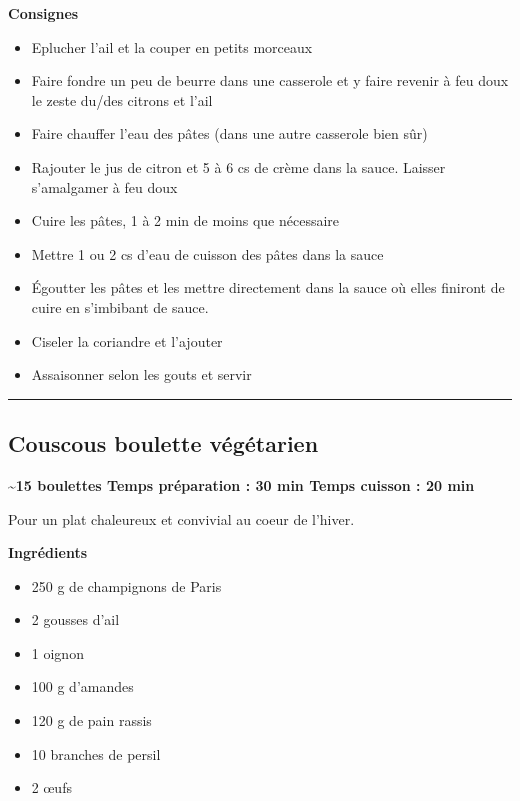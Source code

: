 \documentclass[]{book}
\providecommand{\tightlist}{%
  \setlength{\itemsep}{0pt}\setlength{\parskip}{0pt}}
\begin{document}
\textbf{Consignes}

\begin{itemize}
\tightlist
\item
  Eplucher l'ail et la couper en petits morceaux
\item
  Faire fondre un peu de beurre dans une casserole et y faire revenir à
  feu doux le zeste du/des citrons et l'ail
\item
  Faire chauffer l'eau des pâtes (dans une autre casserole bien sûr)
\item
  Rajouter le jus de citron et 5 à 6 cs de crème dans la sauce. Laisser
  s'amalgamer à feu doux
\item
  Cuire les pâtes, 1 à 2 min de moins que nécessaire
\item
  Mettre 1 ou 2 cs d'eau de cuisson des pâtes dans la sauce
\item
  Égoutter les pâtes et les mettre directement dans la sauce où elles
  finiront de cuire en s'imbibant de sauce.
\item
  Ciseler la coriandre et l'ajouter
\item
  Assaisonner selon les gouts et servir
\end{itemize}

\begin{center}\rule{0.5\linewidth}{0.5pt}\end{center}

\subsection*{\texorpdfstring{{Couscous boulette
végétarien}}{Couscous boulette végétarien}}\label{couscous-boulette-vuxe9guxe9tarien}

\begin{salebox}
\textbf{\textasciitilde{}15 boulettes \textbar{} Temps préparation : 30
min \textbar{} Temps cuisson : 20 min}

Pour un plat chaleureux et convivial au coeur de l'hiver.
\end{salebox}

 \textbf{Ingrédients}

\begin{itemize}
\tightlist
\item
  250 g de champignons de Paris
\item
  2 gousses d'ail
\item
  1 oignon
\item
  100 g d'amandes
\item
  120 g de pain rassis
\item
  10 branches de persil
\item
  2 œufs
\end{itemize}
\end{document}
